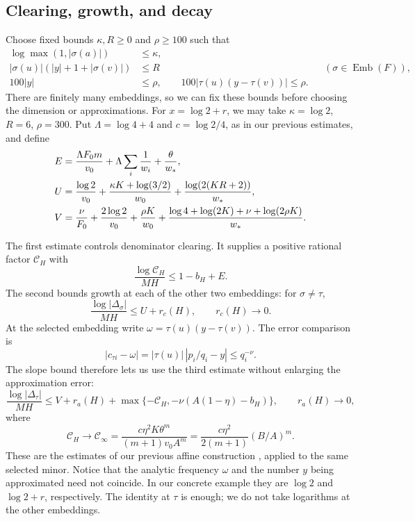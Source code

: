 \documentclass[11pt]{article}
\newcommand{\Emb}{\operatorname{Emb}}
\theoremstyle{remark}
\begin{document}
\subsection{Clearing, growth, and decay}
Choose fixed bounds $\kappa,R\ge0$ and $\rho\ge100$ such that
\begin{align*}
 \log\max(1,|\sigma(a)|)&\le\kappa,\\
 |\sigma(u)|(|y|+1+|\sigma(v)|)&\le R
       &&(\sigma\in\Emb(F)),\\
 100|y|&\le\rho,\qquad
 100|\tau(u)(y-\tau(v))|\le\rho.
\end{align*}
There are finitely many embeddings, so we can fix these bounds
before choosing the dimension or approximations. For $x=\log2+r$,
we may take $\kappa=\log2$, $R=6$, $\rho=300$.
Put $\Lambda=\log4+4$ and $c=\log2/4$, as in our previous estimates,
and define
\begin{align}
 E&=\frac{\Lambda F_0m}{v_0}+\Lambda\sum_i\frac1{w_i}
        +\frac\theta{w_*},\label{eq:errors}\\
 U&=\frac{\log2}{v_0}+\frac{\kappa K+\log(3/2)}{w_0}
        +\frac{\log(2(KR+2))}{w_*},\notag\\
 V&=\frac\nu{F_0}+\frac{2\log2}{v_0}+\frac{\rho K}{w_0}
       +\frac{\log4+\log(2K)+\nu+\log(2\rho K)}{w_*}.\notag
\end{align}

The first estimate controls denominator clearing. It supplies a positive rational factor
$\mathscr C_H$ with
\begin{equation}\label{eq:clearcost}
 \frac{\log\mathscr C_H}{MH}\le1-b_H+E.
\end{equation}
The second bounds growth at each of the other two embeddings:
for $\sigma\ne\tau$,
\begin{equation}\label{eq:coarse}
 \frac{\log|\Delta_\sigma|}{MH}\le U+r_c(H),
 \qquad r_c(H)\longrightarrow0.
\end{equation}
At the selected embedding write $\omega=\tau(u)(y-\tau(v))$.
The error comparison is
\[
 |c_{\tau i}-\omega|
 =|\tau(u)|\,|p_i/q_i-y|\le q_i^{-\nu}.
\]
The slope bound therefore lets us use the third estimate without
enlarging the approximation error:
\begin{equation}\label{eq:good}
 \frac{\log|\Delta_\tau|}{MH}
 \le V+r_a(H)+\max\{-\mathcal C_H,-\nu(A(1-\eta)-b_H)\},
 \qquad r_a(H)\longrightarrow0,
\end{equation}
where
\begin{equation}\label{eq:collision}
 \mathcal C_H\longrightarrow\mathcal C_\infty
 =\frac{c\eta^2K\theta^m}{(m+1)v_0A^m}
 =\frac{c\eta^2}{2(m+1)}(B/A)^m.
\end{equation}
These are the estimates of our previous affine construction
\cite[Sections 6--8]{affine}, applied to the same selected minor.
Notice that the analytic frequency $\omega$ and the number $y$ being
approximated need not coincide. In our concrete example they are
$\log2$ and $\log2+r$, respectively. The identity at $\tau$ is enough; we do not take
logarithms at the other embeddings.
\end{document}
